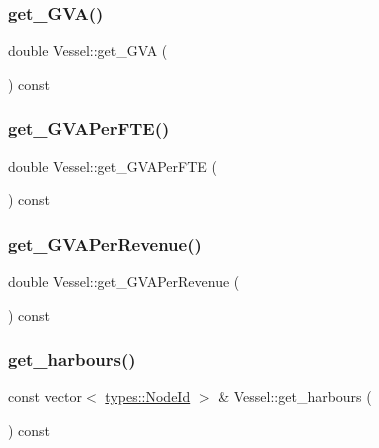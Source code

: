 \mbox{\label{class_vessel_a165c72f151e29e2a16ce666d70c05bae}} 
\subsubsection{\texorpdfstring{get\_GVA()}{get\_GVA()}}
{\footnotesize\ttfamily double Vessel\+::get\+\_\+\+G\+VA (\begin{DoxyParamCaption}{ }\end{DoxyParamCaption}) const}

\mbox{\label{class_vessel_aebc024ff52aff398f1c95fd148ef1f90}} 
\subsubsection{\texorpdfstring{get\_GVAPerFTE()}{get\_GVAPerFTE()}}
{\footnotesize\ttfamily double Vessel\+::get\+\_\+\+G\+V\+A\+Per\+F\+TE (\begin{DoxyParamCaption}{ }\end{DoxyParamCaption}) const}

\mbox{\label{class_vessel_adf1fcfa126cbffb62b2831067a93e83f}} 
\subsubsection{\texorpdfstring{get\_GVAPerRevenue()}{get\_GVAPerRevenue()}}
{\footnotesize\ttfamily double Vessel\+::get\+\_\+\+G\+V\+A\+Per\+Revenue (\begin{DoxyParamCaption}{ }\end{DoxyParamCaption}) const}

\mbox{\label{class_vessel_a592f19e6f192e04b68c58fc45fb01937}} 
\subsubsection{\texorpdfstring{get\_harbours()}{get\_harbours()}}
{\footnotesize\ttfamily const vector$<$ \mbox{\hyperlink{classtypes_1_1_node_id}{types\+::\+Node\+Id}} $>$ \& Vessel\+::get\+\_\+harbours (\begin{DoxyParamCaption}{ }\end{DoxyParamCaption}) const}


